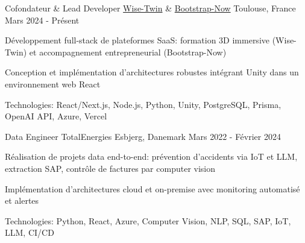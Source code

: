 


\begin{cventries}


\cventry
{Cofondateur \& Lead Developer} %
{\href{https://www.wisetwin.eu}{Wise-Twin} \& \href{https://www.bootstrap-now.com}{Bootstrap-Now}} %
{Toulouse, France} %
{Mars 2024 - Présent} %
{ %
\begin{cvitems}
\item {Développement full-stack de plateformes SaaS: formation 3D immersive (Wise-Twin) et accompagnement entrepreneurial (Bootstrap-Now)}
\item {Conception et implémentation d'architectures robustes intégrant Unity dans un environnement web React}
\item {Technologies: React/Next.js, Node.js, Python, Unity, PostgreSQL, Prisma, OpenAI API, Azure, Vercel}
\end{cvitems}
}


\cventry
{Data Engineer} %
{TotalEnergies} %
{Esbjerg, Danemark} %
{Mars 2022 - Février 2024} %
{ %
\begin{cvitems}
\item {Réalisation de projets data end-to-end: prévention d'accidents via IoT et LLM, extraction SAP, contrôle de factures par computer vision}
\item {Implémentation d'architectures cloud et on-premise avec monitoring automatisé et alertes}
\item {Technologies: Python, React, Azure, Computer Vision, NLP, SQL, SAP, IoT, LLM, CI/CD}
\end{cvitems}
}



\end{cventries}
